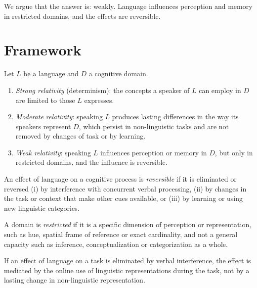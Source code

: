\documentclass{situationist-preprint}
\begin{document}
We argue that the answer is: weakly. Language influences perception and memory in restricted domains, and the effects are reversible.

\section{Framework}

\begin{definition}\label{d:grades}
Let $L$ be a language and $D$ a cognitive domain.
\begin{enumerate}
\item \emph{Strong relativity} (determinism): the concepts a speaker of $L$ can employ in $D$ are limited to those $L$ expresses.
\item \emph{Moderate relativity}: speaking $L$ produces lasting differences in the way its speakers represent $D$, which persist in non-linguistic tasks and are not removed by changes of task or by learning.
\item \emph{Weak relativity}: speaking $L$ influences perception or memory in $D$, but only in restricted domains, and the influence is reversible.
\end{enumerate}
\end{definition}

\begin{definition}[Reversibility]\label{d:rev}
An effect of language on a cognitive process is \emph{reversible} if it is eliminated or reversed (i) by interference with concurrent verbal processing, (ii) by changes in the task or context that make other cues available, or (iii) by learning or using new linguistic categories.
\end{definition}

\begin{definition}\label{d:restricted}
A domain is \emph{restricted} if it is a specific dimension of perception or representation, such as hue, spatial frame of reference or exact cardinality, and not a general capacity such as inference, conceptualization or categorization as a whole.
\end{definition}

\begin{principle}\label{p:online}
If an effect of language on a task is eliminated by verbal interference, the effect is mediated by the online use of linguistic representations during the task, not by a lasting change in non-linguistic representation.
\end{principle}
\end{document}
